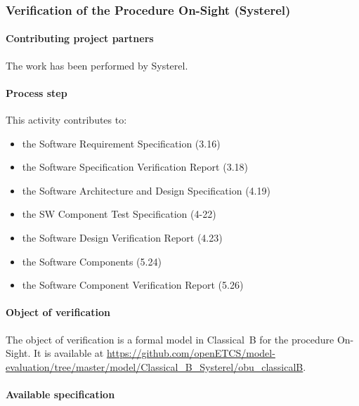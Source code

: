

\subsubsection{Verification of the Procedure On-Sight (Systerel) }
\label{sec:}

\paragraph{Contributing project partners}
The work has been performed by Systerel.

\paragraph{Process step}


This activity contributes to:
\begin{itemize}
\item the Software Requirement Specification  (3.16)
\item the Software Specification Verification Report  (3.18)  
\item the Software Architecture and Design Specification (4.19)
\item the SW Component Test Specification (4-22)
\item the Software Design Verification Report  (4.23)  
\item the Software Components (5.24)
\item the Software Component Verification Report  (5.26)  
\end{itemize}



\paragraph{Object of verification}

The object of verification is a formal model in Classical~B for the
procedure On-Sight. It is available at
{\url{https://github.com/openETCS/model-evaluation/tree/master/model/Classical_B_Systerel/obu_classicalB}}.


\paragraph{Available specification}

